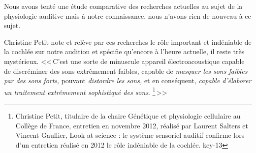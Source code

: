 Nous avons tenté  une étude comparative des
recherches actuelles au sujet de la physiologie auditive mais à notre connaissance, nous n'avons rien de nouveau à ce sujet.

Christine Petit note et relève par ces recherches le rôle important
et indéniable de la cochlée sur notre audition et spécifie qu'encore
à l'heure actuelle, il reste très mystérieux. 
<<\,C'est une sorte de minuscule appareil électroacoustique capable
de discréminer des sons extrêmement faibles, capable de \emph{masquer
les sons faibles par des sons forts}, pouvant \emph{distordre les
sons,} et en conséquent, \emph{capable d'élaborer un traitement extrêmement
sophistiqué des sons}.%
\footnote{ Christine Petit, titulaire de la chaire Génétique et
	physiologie cellulaire au Collège de France, entretien en novembre 2012, réalisé par Laurent Salters et Vincent Gaullier, Look at science : le système sensoriel auditif confirme lors d'un entretien réalisé en 2012 le rôle indéniable de la cochlée. key-13}\,>>

